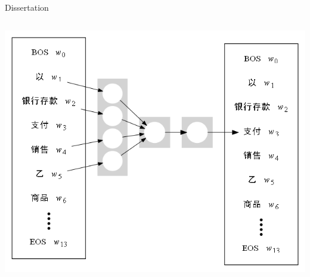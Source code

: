 \begin{xframe}{Dissertation}
\begin{columns}
\begin{center}
            \includegraphics[height=0.6\textheight]{./style/images/w2v.png}
        \end{center}

    \end{columns}

\end{xframe}

